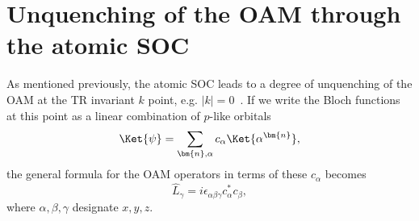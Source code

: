 \section{Unquenching of the OAM through the atomic SOC}
As mentioned previously, the atomic SOC leads to a degree of unquenching of the OAM at the TR invariant $k$ point, e.g. $|k|=0$~\cite{Park2011,Park2012,Park2015}.
If we write the Bloch functions at this point as a linear combination of $p$-like orbitals
\begin{equation}
\Ket{\psi} = \sum_{\bm{n},\alpha} c_\alpha \Ket{\alpha^{\bm{n}}},
\end{equation}
the general formula for the OAM operators in terms of these $c_\alpha$ becomes
\begin{equation}
	\hat{L}_{\gamma}= i \epsilon_{\alpha \beta \gamma} c^*_\alpha c_\beta,
\end{equation}
where $\alpha,\beta,\gamma$ designate $x,y,z$.

